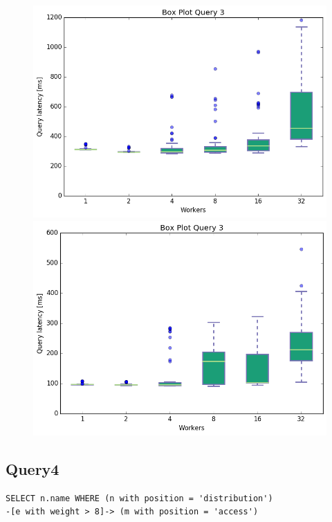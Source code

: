 \documentclass[11pt,singlecolumn]{scrartcl}
\begin{document}
\begin{figure}[!tbp]
  \centering
  \RawFloats
  \begin{minipage}[b]{0.5\textwidth}
    \includegraphics[width=\textwidth]{boxesjl/q3}
  \end{minipage}
  \hfill
  \begin{minipage}[b]{0.5\textwidth}
    \includegraphics[width=\textwidth]{boxesjs/q3}
  \end{minipage}
\end{figure}
\clearpage
\subsection{Query4}
\begin{verbatim}
SELECT n.name WHERE (n with position = 'distribution')
-[e with weight > 8]-> (m with position = 'access')\end{verbatim}
\end{document}
